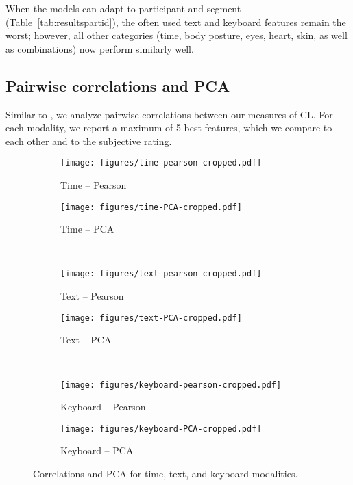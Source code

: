 \documentclass[output=paper]{langsci/langscibook}
\begin{document}
When the models can adapt to participant and segment (Table~\ref{tab:resultspartid}), the often used text and keyboard features remain the worst; however, all other categories (time, body posture, eyes, heart, skin, as well as combinations) now perform similarly well.

\subsection{Pairwise correlations and PCA}
Similar to \citet{vieira2016measures}, we analyze pairwise correlations between our measures of CL. For each modality, we report a maximum of 5 best features, which we compare to each other and to the subjective rating.

\begin{figure}
    \begin{subfigure}[b]{0.5\textwidth}\centering
        \texttt{[image: figures/time-pearson-cropped.pdf]}
        \caption{Time -- Pearson}
    \end{subfigure}%
    \begin{subfigure}[b]{0.5\textwidth}\centering
        \texttt{[image: figures/time-PCA-cropped.pdf]}
        \caption{Time -- PCA}
    \end{subfigure}\bigskip\\
    \begin{subfigure}[b]{0.5\textwidth}\centering
        \texttt{[image: figures/text-pearson-cropped.pdf]}
        \caption{Text -- Pearson}
    \end{subfigure}%
    \begin{subfigure}[b]{0.5\textwidth}\centering
        \texttt{[image: figures/text-PCA-cropped.pdf]}
        \caption{Text -- PCA}
    \end{subfigure}\bigskip\\
    \begin{subfigure}[b]{0.5\textwidth}\centering
        \texttt{[image: figures/keyboard-pearson-cropped.pdf]}
        \caption{Keyboard -- Pearson}
    \end{subfigure}%
    \begin{subfigure}[b]{0.5\textwidth}\centering
        \texttt{[image: figures/keyboard-PCA-cropped.pdf]}
        \caption{Keyboard -- PCA}
    \end{subfigure}
    \caption{Correlations and PCA for time, text, and keyboard modalities.\label{fig:plotscorrpca1}}
\end{figure}
\end{document}
